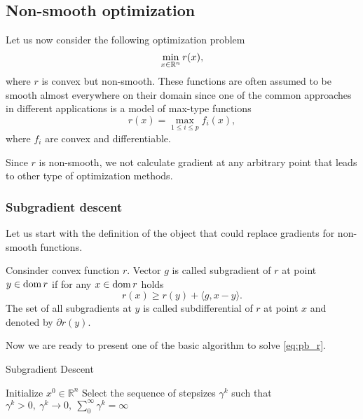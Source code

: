 \subsection{Non-smooth optimization}\label{sec:basics_nonsmooth}
Let us now consider the following optimization problem
\begin{equation}\label{eq:pb_r}
\min_{x\in\mathbb{R}^n} r(x),
\end{equation}
where $r$ is convex but non-smooth. {These functions are often assumed to be smooth almost everywhere on their domain since one of the common approaches in different applications is a model of max-type functions
$$
r(x) = \max_{1\leq i \leq p} f_i(x),
$$
where $f_i$ are convex and differentiable.
}

Since $r$ is non-smooth, we  not calculate  gradient at any arbitrary point that leads to other type of optimization methods. 
\subsubsection{Subgradient descent} {Let us start with the definition of the object that could replace gradients for non-smooth functions.}

\begin{definition}[Subgradient]
Consinder convex function $r$. Vector $g$ is called subgradient of $r$ at point $y\in\mathrm{dom}\,r$ if for any $x\in\mathrm{dom}\,r$ holds
\begin{equation}\label{eq:subgrad}
r(x)\geq r(y) + \langle g, x-y\rangle.
\end{equation}
The set of all subgradients at $y$ is called subdifferential of $r$ at point $x$ and denoted by $\partial r(y)$.
\end{definition}

Now we are ready to present one of the basic algorithm \cite[Chapter $3$]{nesterov-book} to solve \eqref{eq:pb_r}.

\begin{algorithm}
    \caption{Subgradient Descent}
    \label{algo:sd}
    \begin{algorithmic}
        \STATE Initialize $x^0\in\mathbb{R}^n$
        \STATE Select the sequence of stepsizes $\gamma^k$ such that
        $
            \gamma^k>0,~\gamma^k\rightarrow 0,~\sum_0^\infty \gamma^k = \infty
        $
        \ENDFOR
    \end{algorithmic}
\end{algorithm}

